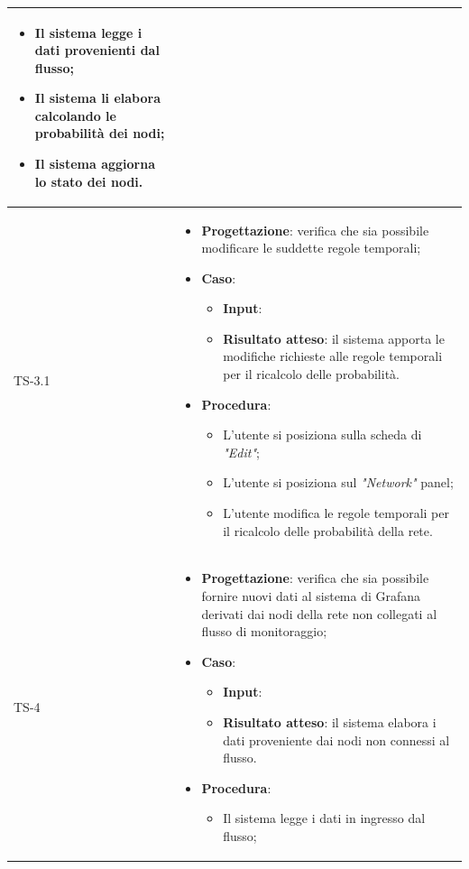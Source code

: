 \begin{longtable}{|C{2.5cm}|C{13cm}|}
\begin{itemize}
	\begin{itemize}
		\item Il sistema legge i dati provenienti dal flusso;
		\item Il sistema li elabora calcolando le probabilità dei nodi;
		\item Il sistema aggiorna lo stato dei nodi.
	\end{itemize} 
\end{itemize}	
	\\
	\hline
	{TS-3.1} & 
\begin{itemize}
	\item \textbf{Progettazione}: verifica che sia possibile modificare le
	suddette regole temporali;
	\item \textbf{Caso}: 
	\begin{itemize}
		\item \textbf{Input}: 
		\item \textbf{Risultato atteso}: il sistema apporta le modifiche richieste alle regole temporali per il ricalcolo delle probabilità.
	\end{itemize}
	\item \textbf{Procedura}:
	\begin{itemize}
		\item L'utente si posiziona sulla scheda di \emph{"Edit"};
		\item L'utente si posiziona sul \emph{"Network"} panel;
		\item L'utente modifica le regole temporali per il ricalcolo delle probabilità della rete.
	\end{itemize} 
\end{itemize}
\\
	\hline
	{TS-4} & 
\begin{itemize}
	\item \textbf{Progettazione}: verifica che sia possibile fornire nuovi dati
	al sistema di Grafana derivati dai nodi della rete non collegati al flusso di
	monitoraggio;
	\item \textbf{Caso}: 
	\begin{itemize}
	\item \textbf{Input}:
	\item \textbf{Risultato atteso}: il sistema elabora i dati proveniente dai nodi non connessi al flusso.
	\end{itemize}
	\item \textbf{Procedura}:
	\begin{itemize}
	\item Il sistema legge i dati in ingresso dal flusso;

\end{itemize}
\end{itemize}
\end{longtable}
